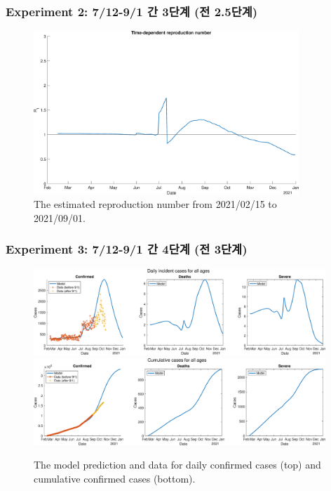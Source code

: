 \documentclass[aspectratio=169, 9pt, xcolor=dvipsnames]{beamer}
\begin{document}
	\begin{frame}\frametitle{Experiment 2: 7/12-9/1 간 3단계 (전 2.5단계)}
	    \begin{figure}
	    	\centering
	    	\includegraphics[width=10cm]{../results/predict_exp_2_sd3_same_school_same/rep_num.eps}
	    	\caption{The estimated reproduction number from 2021/02/15 to 2021/09/01.}
	    \end{figure}
	\end{frame}

	\begin{frame}\frametitle{Experiment 3: 7/12-9/1 간 4단계 (전 3단계)}
	    \begin{figure}
	    	\centering
	    	\includegraphics[width=11cm]{../results/predict_exp_3_sd3_same_school_same/daily_all_age.eps}
	    	\includegraphics[width=11cm]{../results/predict_exp_3_sd3_same_school_same/cumul_all_age.eps}
	    	\caption{The model prediction and data for daily confirmed cases (top) and cumulative confirmed cases (bottom).}
	    \end{figure}
	\end{frame}
\end{document}
